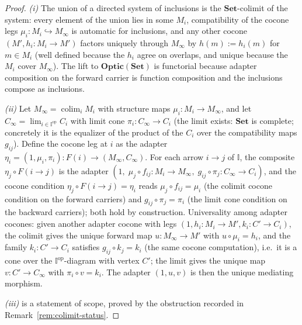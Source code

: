 \documentclass[11pt,a4paper]{article}
\theoremstyle{plain}
\theoremstyle{definition}
\theoremstyle{remark}
\newcommand{\Optic}{\mathbf{Optic}}
\newcommand{\colim}{\operatorname{colim}}
\begin{document}
\begin{proof}
\emph{(i)} The union of a directed system of inclusions is the
$\mathbf{Set}$-colimit of the system: every element of the union lies
in some $M_{i}$, compatibility of the cocone legs
$\mu_{i}:M_{i}\hookrightarrow M_{\infty}$ is automatic for
inclusions, and any other cocone $(M', h_{i}:M_{i}\to M')$ factors
uniquely through $M_{\infty}$ by $h(m) := h_{i}(m)$ for
$m\in M_{i}$ (well defined because the $h_{i}$ agree on overlaps, and
unique because the $M_{i}$ cover $M_{\infty}$). The lift to
$\Optic(\mathbf{Set})$ is functorial because adapter composition on
the forward carrier is function composition and the inclusions
compose as inclusions.

\emph{(ii)} Let $M_{\infty}=\colim_{i}M_{i}$ with structure maps
$\mu_{i}:M_{i}\to M_{\infty}$, and let $C_{\infty}=
\lim_{i\in\mathbb I^{\mathrm{op}}}C_{i}$ with limit cone
$\pi_{i}:C_{\infty}\to C_{i}$ (the limit exists: $\mathbf{Set}$ is
complete; concretely it is the equalizer of the product of the
$C_{i}$ over the compatibility maps $g_{ij}$). Define the cocone leg
at $i$ as the adapter $\eta_{i}=(1,\mu_{i},\pi_{i}):
F(i)\to(M_{\infty},C_{\infty})$. For each arrow $i\to j$ of
$\mathbb I$, the composite
$\eta_{j}\circ F(i\to j)$ is the adapter $(1,\;
\mu_{j}\circ f_{ij}:M_{i}\to M_{\infty},\;
g_{ij}\circ\pi_{j}:C_{\infty}\to C_{i})$, and the cocone condition
$\eta_{j}\circ F(i\to j)=\eta_{i}$ reads
$\mu_{j}\circ f_{ij}=\mu_{i}$ (the colimit cocone condition on the
forward carriers) and $g_{ij}\circ\pi_{j}=\pi_{i}$ (the limit cone
condition on the backward carriers); both hold by construction.
Universality among adapter cocones: given another adapter cocone with
legs $(1,h_{i}:M_{i}\to M',k_{i}:C'\to C_{i})$, the colimit gives the
unique forward map $u:M_{\infty}\to M'$ with $u\circ\mu_{i}=h_{i}$,
and the family $k_{i}:C'\to C_{i}$ satisfies
$g_{ij}\circ k_{j}=k_{i}$ (the same cocone computation), i.e.\ it is
a cone over the $\mathbb I^{\mathrm{op}}$-diagram with vertex $C'$;
the limit gives the unique map $v:C'\to C_{\infty}$ with
$\pi_{i}\circ v=k_{i}$. The adapter $(1,u,v)$ is then the unique
mediating morphism.

\emph{(iii)} is a statement of scope, proved by the obstruction
recorded in Remark~\ref{rem:colimit-status}.
\end{proof}
\end{document}
